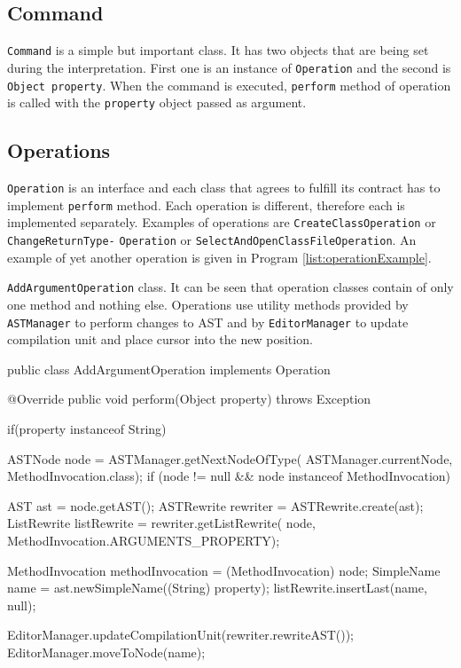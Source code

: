 \subsection{Command}
\texttt{Command} is a simple but important class. It has two objects that are being set during the interpretation. First one is an instance of \texttt{Operation} and the second is \texttt{Object property}. When the command is executed, \texttt{perform} method of operation is called with the \texttt{property} object passed as argument.

\subsection{Operations}
\texttt{Operation} is an interface and each class that agrees to fulfill its contract has to implement \texttt{perform} method. Each operation is different, therefore each is implemented separately. Examples of operations are \eg \texttt{CreateClassOperation} or \texttt{ChangeReturnType-} \texttt{Operation} or \texttt{SelectAndOpenClassFileOperation}. An example of yet another operation is given in Program \ref{list:operationExample}.


\begin{program}[hbt!]
    \caption{\texttt{AddArgumentOperation} class. It can be seen that operation classes contain of only one method and nothing else. Operations use utility methods provided by \texttt{ASTManager} to perform changes to AST and by \texttt{EditorManager} to update compilation unit and place cursor into the new position.}
    \label{list:operationExample}
    \begin{JavaCode}
public class AddArgumentOperation implements Operation {

	@Override
	public void perform(Object property) throws Exception {
		if(property instanceof String) {
			ASTNode node = ASTManager.getNextNodeOfType(
		    	ASTManager.currentNode, MethodInvocation.class);
			if (node != null && node instanceof MethodInvocation) {
				AST ast = node.getAST();
				ASTRewrite rewriter = ASTRewrite.create(ast);
				ListRewrite listRewrite = rewriter.getListRewrite(
				    node, MethodInvocation.ARGUMENTS_PROPERTY);
				
				MethodInvocation methodInvocation = (MethodInvocation) node;
				SimpleName name = ast.newSimpleName((String) property);
				listRewrite.insertLast(name,  null);
			
				EditorManager.updateCompilationUnit(rewriter.rewriteAST());
				EditorManager.moveToNode(name);		
			}
				
		}
	}
}   \end{JavaCode}
\end{program}

